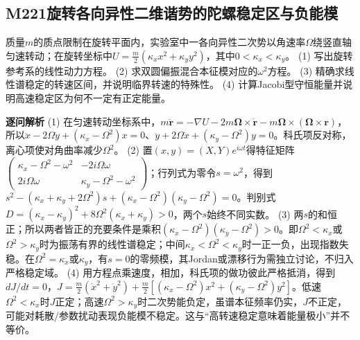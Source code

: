 \subsection*{M221\quad 旋转各向异性二维谐势的陀螺稳定区与负能模}
质量$m$的质点限制在旋转平面内，实验室中一各向异性二次势以角速率$\Omega$绕竖直轴匀速转动；在旋转坐标中$U=\frac m2(\kappa_x x^2+\kappa_y y^2)$，其中$0<\kappa_x<\kappa_y$。
(1) 写出旋转参考系的线性动力方程。
(2) 求双圆偏振混合本征模对应的$\omega^2$方程。
(3) 精确求线性谱稳定的转速区间，并说明临界转速的特殊性。
(4) 计算Jacobi型守恒能量并说明高速稳定区为何不一定有正定能量。
\par\textbf{逐问解析}
(1) 在匀速转动坐标系中，$m\ddot{\boldsymbol r}=-\nabla U-2m\boldsymbol\Omega\times\dot{\boldsymbol r}-m\boldsymbol\Omega\times(\boldsymbol\Omega\times\boldsymbol r)$，所以$\ddot x-2\Omega\dot y+(\kappa_x-\Omega^2)x=0$、$\ddot y+2\Omega\dot x+(\kappa_y-\Omega^2)y=0$。科氏项反对称，离心项使对角曲率减少$\Omega^2$。
(2) 置$(x,y)=(X,Y)e^{i\omega t}$得特征矩阵$\begin{pmatrix}\kappa_x-\Omega^2-\omega^2&-2i\Omega\omega\\2i\Omega\omega&\kappa_y-\Omega^2-\omega^2\end{pmatrix}$；行列式为零令$s=\omega^2$，得到$s^2-(\kappa_x+\kappa_y+2\Omega^2)s+(\kappa_x-\Omega^2)(\kappa_y-\Omega^2)=0$。判别式$D=(\kappa_x-\kappa_y)^2+8\Omega^2(\kappa_x+\kappa_y)>0$，两个$s$始终不同实数。
(3) 两$s$的和恒正；所以两者皆正的充要条件是乘积$(\kappa_x-\Omega^2)(\kappa_y-\Omega^2)>0$。即$\Omega^2<\kappa_x$或$\Omega^2>\kappa_y$时为振荡有界的线性谱稳定；中间$\kappa_x<\Omega^2<\kappa_y$时一正一负，出现指数失稳。在$\Omega^2=\kappa_x$或$\kappa_y$，有$s=0$的零频模，其Jordan或漂移行为需独立讨论，不归入严格稳定域。
(4) 用方程点乘速度，相加，科氏项的做功彼此严格抵消，得到$dJ/dt=0$，$J=\frac m2(\dot x^2+\dot y^2)+\frac m2[(\kappa_x-\Omega^2)x^2+(\kappa_y-\Omega^2)y^2]$。低速$\Omega^2<\kappa_x$时$J$正定；高速$\Omega^2>\kappa_y$时二次势能负定，虽谱本征频率仍实，$J$不正定，可能对耗散/参数扰动表现负能模不稳定。这与“高转速稳定意味着能量极小”并不等价。
\par\medskip
